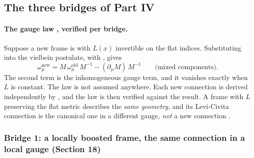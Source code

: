\subsection{The three bridges of Part IV}
\label{csc:bridges}\label{sec:9.9}

\paragraph{The gauge law , verified per bridge.} Suppose a new frame is
 with $L(x)$ invertible on the flat indices. Substituting into the
vielbein postulate, with , gives
\begin{equation}
  \omega^{\text{new}}_\mu=M\,\omega^{\text{old}}_\mu\,M^{-1}-(\partial_\mu M)\,M^{-1}\qquad\text{(mixed components)}.
\end{equation}
The second term is the inhomogeneous gauge term, and it vanishes exactly when $L$ is constant.
The law is not assumed anywhere. Each new connection is derived independently by
, and the law is then verified against the result. A frame
 with $L$ preserving the flat metric describes the \emph{same geometry},
and its Levi-Civita connection is the canonical one in a different gauge, \emph{not} a new
connection .

\subsubsection{Bridge 1: a locally boosted frame, the same connection in a local gauge (Section 18)}
\label{sec:9.9.1}

